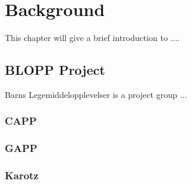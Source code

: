 \chapter{Background}
\label{background}


This chapter will give a brief introduction to ....


\section{BLOPP Project}
Barns Legemiddelopplevelser is a project group ...

\subsection{CAPP}


\subsection{GAPP}


\subsection{Karotz}
